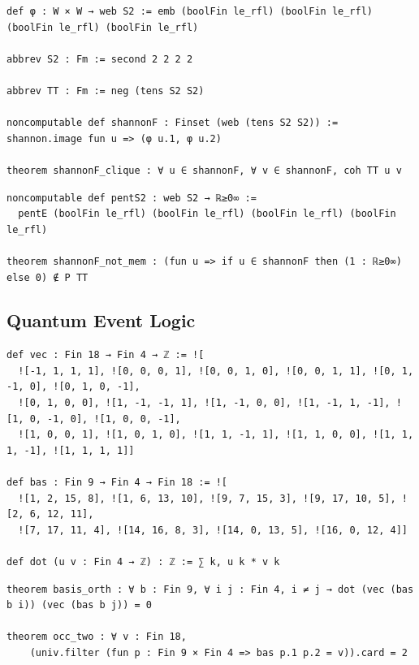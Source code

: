 \label{lean:shannon-clique}
\begin{lstlisting}
def φ : W × W → web S2 := emb (boolFin le_rfl) (boolFin le_rfl) (boolFin le_rfl) (boolFin le_rfl)

abbrev S2 : Fm := second 2 2 2 2

abbrev TT : Fm := neg (tens S2 S2)

noncomputable def shannonF : Finset (web (tens S2 S2)) := shannon.image fun u => (φ u.1, φ u.2)

theorem shannonF_clique : ∀ u ∈ shannonF, ∀ v ∈ shannonF, coh TT u v
\end{lstlisting}

\label{lean:shannon-not-mem}
\begin{lstlisting}
noncomputable def pentS2 : web S2 → ℝ≥0∞ :=
  pentE (boolFin le_rfl) (boolFin le_rfl) (boolFin le_rfl) (boolFin le_rfl)

theorem shannonF_not_mem : (fun u => if u ∈ shannonF then (1 : ℝ≥0∞) else 0) ∉ P TT
\end{lstlisting}

\subsection{Quantum Event Logic}

\label{lean:cabello-set}
\begin{lstlisting}
def vec : Fin 18 → Fin 4 → ℤ := ![
  ![-1, 1, 1, 1], ![0, 0, 0, 1], ![0, 0, 1, 0], ![0, 0, 1, 1], ![0, 1, -1, 0], ![0, 1, 0, -1],
  ![0, 1, 0, 0], ![1, -1, -1, 1], ![1, -1, 0, 0], ![1, -1, 1, -1], ![1, 0, -1, 0], ![1, 0, 0, -1],
  ![1, 0, 0, 1], ![1, 0, 1, 0], ![1, 1, -1, 1], ![1, 1, 0, 0], ![1, 1, 1, -1], ![1, 1, 1, 1]]

def bas : Fin 9 → Fin 4 → Fin 18 := ![
  ![1, 2, 15, 8], ![1, 6, 13, 10], ![9, 7, 15, 3], ![9, 17, 10, 5], ![2, 6, 12, 11],
  ![7, 17, 11, 4], ![14, 16, 8, 3], ![14, 0, 13, 5], ![16, 0, 12, 4]]

def dot (u v : Fin 4 → ℤ) : ℤ := ∑ k, u k * v k
\end{lstlisting}

\label{lean:basis-orth}
\begin{lstlisting}
theorem basis_orth : ∀ b : Fin 9, ∀ i j : Fin 4, i ≠ j → dot (vec (bas b i)) (vec (bas b j)) = 0

theorem occ_two : ∀ v : Fin 18,
    (univ.filter (fun p : Fin 9 × Fin 4 => bas p.1 p.2 = v)).card = 2
\end{lstlisting}

